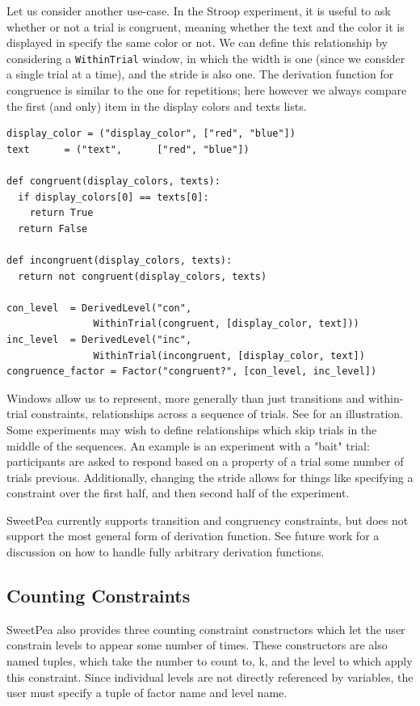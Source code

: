 Let us consider another use-case. In the Stroop experiment, it is useful to ask whether or not a trial is congruent, meaning whether the text and the color it is displayed in specify the same color or not. We can define this relationship by considering a \texttt{WithinTrial} window, in which the width is one (since we consider a single trial at a time), and the stride is also one. The derivation function for congruence is similar to the one for repetitions; here however we always compare the first (and only) item in the display colors and texts lists.

\begin{verbatim}
display_color = ("display_color", ["red", "blue"])
text      = ("text",      ["red", "blue"])

def congruent(display_colors, texts):
  if display_colors[0] == texts[0]:
    return True
  return False

def incongruent(display_colors, texts):
  return not congruent(display_colors, texts)

con_level  = DerivedLevel("con",
               WithinTrial(congruent, [display_color, text]))
inc_level  = DerivedLevel("inc",
               WithinTrial(incongruent, [display_color, text])
congruence_factor = Factor("congruent?", [con_level, inc_level])
\end{verbatim}

Windows allow us to represent, more generally than just transitions and within-trial constraints, relationships across a sequence of trials. See  for an illustration. Some experiments may wish to define relationships which skip trials in the middle of the sequences. An example is an experiment with a "bait" trial: participants are asked to respond based on a property of a trial some number of trials previous. Additionally, changing the stride allows for things like specifying a constraint over the first half, and then second half of the experiment.

SweetPea currently supports transition and congruency constraints, but does not support the most general form of derivation function. See future work for a discussion on how to handle fully arbitrary derivation functions.

\subsection{Counting Constraints}
SweetPea also provides three counting constraint constructors which let the user constrain levels to appear some number of times. These constructors are also named tuples, which take the number to count to, k, and the level to which apply this constraint. Since individual levels are not directly referenced by variables, the user must specify a tuple of factor name and level name.


